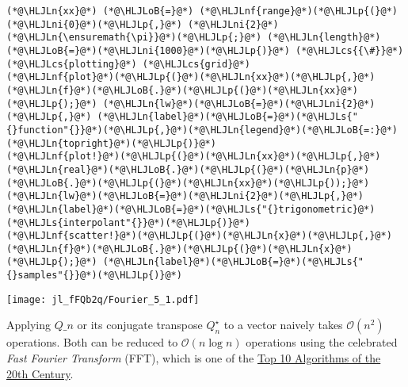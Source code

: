 \documentclass[12pt,a4paper]{article}
\newcommand{\HLJLn}[1]{#1}
\newcommand{\HLJLnf}[1]{\textcolor[RGB]{66,102,213}{#1}}
\newcommand{\HLJLs}[1]{\textcolor[RGB]{201,61,57}{#1}}
\newcommand{\HLJLni}[1]{\textcolor[RGB]{59,151,46}{#1}}
\newcommand{\HLJLoB}[1]{\textcolor[RGB]{102,102,102}{\textbf{#1}}}
\newcommand{\HLJLp}[1]{#1}
\newcommand{\HLJLcs}[1]{\textcolor[RGB]{153,153,119}{\textit{#1}}}
\begin{document}
\begin{lstlisting}
(*@\HLJLn{xx}@*) (*@\HLJLoB{=}@*) (*@\HLJLnf{range}@*)(*@\HLJLp{(}@*)(*@\HLJLni{0}@*)(*@\HLJLp{,}@*) (*@\HLJLni{2}@*)(*@\HLJLn{\ensuremath{\pi}}@*)(*@\HLJLp{;}@*) (*@\HLJLn{length}@*)(*@\HLJLoB{=}@*)(*@\HLJLni{1000}@*)(*@\HLJLp{)}@*) (*@\HLJLcs{{\#}}@*) (*@\HLJLcs{plotting}@*) (*@\HLJLcs{grid}@*)
(*@\HLJLnf{plot}@*)(*@\HLJLp{(}@*)(*@\HLJLn{xx}@*)(*@\HLJLp{,}@*) (*@\HLJLn{f}@*)(*@\HLJLoB{.}@*)(*@\HLJLp{(}@*)(*@\HLJLn{xx}@*)(*@\HLJLp{);}@*) (*@\HLJLn{lw}@*)(*@\HLJLoB{=}@*)(*@\HLJLni{2}@*)(*@\HLJLp{,}@*) (*@\HLJLn{label}@*)(*@\HLJLoB{=}@*)(*@\HLJLs{"{}function"{}}@*)(*@\HLJLp{,}@*)(*@\HLJLn{legend}@*)(*@\HLJLoB{=:}@*)(*@\HLJLn{topright}@*)(*@\HLJLp{)}@*)
(*@\HLJLnf{plot!}@*)(*@\HLJLp{(}@*)(*@\HLJLn{xx}@*)(*@\HLJLp{,}@*) (*@\HLJLn{real}@*)(*@\HLJLoB{.}@*)(*@\HLJLp{(}@*)(*@\HLJLn{p}@*)(*@\HLJLoB{.}@*)(*@\HLJLp{(}@*)(*@\HLJLn{xx}@*)(*@\HLJLp{));}@*) (*@\HLJLn{lw}@*)(*@\HLJLoB{=}@*)(*@\HLJLni{2}@*)(*@\HLJLp{,}@*) (*@\HLJLn{label}@*)(*@\HLJLoB{=}@*)(*@\HLJLs{"{}trigonometric}@*) (*@\HLJLs{interpolant"{}}@*)(*@\HLJLp{)}@*)
(*@\HLJLnf{scatter!}@*)(*@\HLJLp{(}@*)(*@\HLJLn{x}@*)(*@\HLJLp{,}@*) (*@\HLJLn{f}@*)(*@\HLJLoB{.}@*)(*@\HLJLp{(}@*)(*@\HLJLn{x}@*)(*@\HLJLp{);}@*) (*@\HLJLn{label}@*)(*@\HLJLoB{=}@*)(*@\HLJLs{"{}samples"{}}@*)(*@\HLJLp{)}@*)
\end{lstlisting}

\texttt{[image: jl\_fFQb2q/Fourier\_5\_1.pdf]}

Applying $Q\ensuremath{\_n}$ or its conjugate transpose $Q_n^\ensuremath{\star}$ to a vector naively takes $\mathcal{O}(n^2)$ operations. Both can be reduced to $\mathcal{O}(n \log n)$ operations using the celebrated \emph{Fast Fourier Transform} (FFT), which is one of the \href{https://pi.math.cornell.edu/~web6140/}{Top 10 Algorithms of the 20th Century}.
\end{document}
